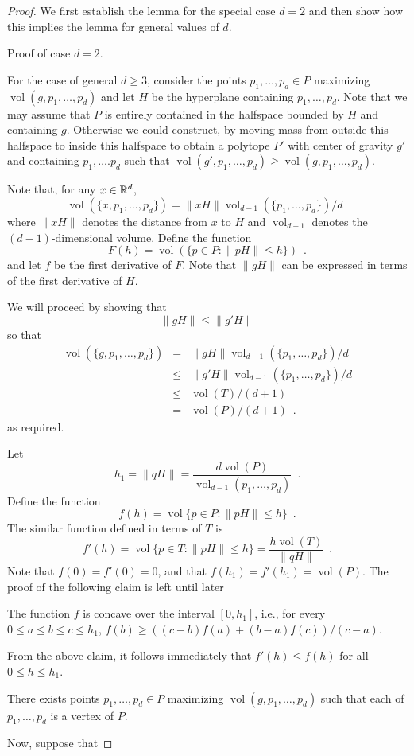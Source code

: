 \documentclass[lotsofwhite]{patmorin}
\DeclareMathOperator{\vol}{vol}
\begin{document}
\begin{proof} 
We first establish the lemma for the special case $d=2$ and then
show how this implies the lemma for general values of $d$.

Proof of case $d=2$.

For the case of general $d\ge 3$, consider the points
$p_1,\ldots,p_d\in P$ maximizing $\vol(g,p_1,\ldots,p_d)$ and let $H$
be the hyperplane containing $p_1,\ldots,p_d$.  Note that we may
assume that $P$ is entirely contained in the halfspace bounded by $H$
and containing $g$.  Otherwise we could construct, by moving mass from
outside this halfspace to inside this halfspace to obtain a polytope
$P'$ with center of gravity $g'$ and containing $p_1,\ldots.p_d$ such
that $\vol(g',p_1,\ldots,p_d)\ge \vol(g,p_1,\ldots,p_d)$.

Note that, for any $x\in\mathbb{R}^d$, 
\[  
    \vol(\{x,p_1,\ldots,p_d\}) = \|xH\|\vol_{d-1}(\{p_1,\ldots,p_d\}) / d
	\enspace 
\] 
where $\|xH\|$ denotes the distance from $x$ to $H$ and $\vol_{d-1}$
denotes the $(d-1)$-dimensional volume.
Define the function
\[
   F(h) = \vol(\{p\in P : \|pH\| \le h\}) \enspace .
\]
and let $f$ be the first derivative of $F$.  Note that $\|gH\|$ can be
expressed in terms of the first derivative of $H$.




We will proceed by showing that 
\[
    \|gH\| \le \|g'H\|
\]
so that
\begin{eqnarray*}
    \vol(\{g,p_1,\ldots,p_d\}) 
	& = & \|gH\|\vol_{d-1}(\{p_1,\ldots,p_d\}) /d  \\
        & \le & \|g'H\|\vol_{d-1}(\{p_1,\ldots,p_d\}) /d \\
	& \le & \vol(T)/(d+1) \\
        & = & \vol(P)/(d+1) \enspace .
\end{eqnarray*}
as required. 

Let
\[  
    h_1 = \|qH\|=\frac{d\vol(P)}{\vol_{d-1}(p_1,\ldots,p_d)} \enspace .
\]
Define the function 
\[
    f(h) = \vol\{ p\in P: \|pH\|\le h\} \enspace .
\]
The similar function defined in terms of $T$ is
\[
    f'(h)=\vol\{p\in T:\|pH\|\le h\} = \frac{h\vol(T)}{\|qH\|}
	\enspace .
\]
Note that $f(0) = f'(0)=0$, and that $f(h_1)=f'(h_1) = \vol(P)$.
The proof of the following claim is left until later
\begin{clm}
The function $f$ is concave over the interval $[0,h_1]$, i.e., for
every $0\le a\le b \le c \le h_1$, $f(b) \ge
((c-b)f(a)+(b-a)f(c))/(c-a)$.
\end{clm}
From the above claim, it follows immediately that $f'(h)\le f(h)$ for all $0\le
h\le h_1$.








\begin{clm}
There exists points $p_1,\ldots,p_d\in P$ maximizing
$\vol(g,p_1,\ldots,p_d)$ such that each of $p_1,\ldots,p_d$ is a vertex of
$P$.
\end{clm}

Now, suppose that 

\end{proof}
\end{document}
